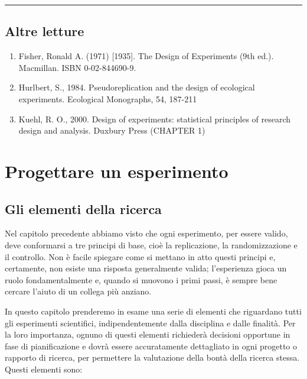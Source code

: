 \documentclass[a4paper,12pt,oneside]{book}
\providecommand{\tightlist}{%
  \setlength{\itemsep}{0pt}\setlength{\parskip}{0pt}}
\begin{document}
\begin{center}\rule{0.5\linewidth}{0.5pt}\end{center}

\hypertarget{altre-letture}{%
\section{Altre letture}\label{altre-letture}}

\begin{enumerate}
\def\labelenumi{\arabic{enumi}.}
\tightlist
\item
  Fisher, Ronald A. (1971) {[}1935{]}. The Design of Experiments (9th ed.). Macmillan. ISBN 0-02-844690-9.
\item
  Hurlbert, S., 1984. Pseudoreplication and the design of ecological experiments. Ecological Monographs, 54, 187-211
\item
  Kuehl, R. O., 2000. Design of experiments: statistical principles of research design and analysis. Duxbury Press (CHAPTER 1)
\end{enumerate}

\hypertarget{progettare-un-esperimento}{%
\chapter{Progettare un esperimento}\label{progettare-un-esperimento}}

\hypertarget{gli-elementi-della-ricerca}{%
\section{Gli elementi della ricerca}\label{gli-elementi-della-ricerca}}

Nel capitolo precedente abbiamo visto che ogni esperimento, per essere valido, deve conformarsi a tre principi di base, cioè la replicazione, la randomizzazione e il controllo. Non è facile spiegare come si mettano in atto questi principi e, certamente, non esiste una risposta generalmente valida; l'esperienza gioca un ruolo fondamentalmente e, quando si muovono i primi passi, è sempre bene cercare l'aiuto di un collega più anziano.

In questo capitolo prenderemo in esame una serie di elementi che riguardano tutti gli esperimenti scientifici, indipendentemente dalla disciplina e dalle finalità. Per la loro importanza, ognuno di questi elementi richiederà decisioni opportune in fase di pianificazione e dovrà essere accuratamente dettagliato in ogni progetto o rapporto di ricerca, per permettere la valutazione della bontà della ricerca stessa. Questi elementi sono:
\end{document}
